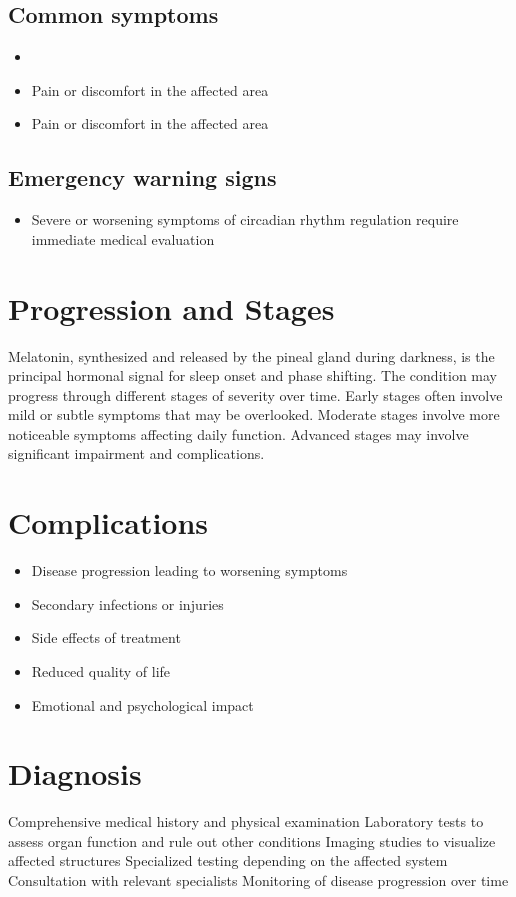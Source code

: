 \subsection{Common symptoms}
\begin{itemize}[noitemsep]
  \item \item Pain or discomfort in the affected area    \item Pain or discomfort in the affected area
  \end{itemize}

\subsection{Emergency warning signs}
\begin{itemize}[noitemsep]
  \item Severe or worsening symptoms of circadian rhythm regulation require immediate medical evaluation
\end{itemize}
\section{Progression and Stages}
Melatonin, synthesized and released by the pineal gland during darkness, is the principal hormonal signal for sleep onset and phase shifting. The condition may progress through different stages of severity over time. Early stages often involve mild or subtle symptoms that may be overlooked. Moderate stages involve more noticeable symptoms affecting daily function. Advanced stages may involve significant impairment and complications.
\section{Complications}
\begin{itemize}[noitemsep]
  \item Disease progression leading to worsening symptoms
  \item Secondary infections or injuries
  \item Side effects of treatment
  \item Reduced quality of life
  \item Emotional and psychological impact
\end{itemize}
\section{Diagnosis}
Comprehensive medical history and physical examination Laboratory tests to assess organ function and rule out other conditions Imaging studies to visualize affected structures Specialized testing depending on the affected system Consultation with relevant specialists Monitoring of disease progression over time


